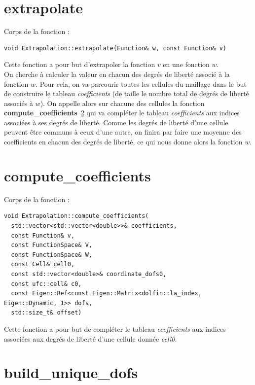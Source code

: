 \documentclass[french]{article}
\begin{document}
	\section{extrapolate}
	\label{extrapolate}
	
	Corps de la fonction :

	\begin{lstlisting}
void Extrapolation::extrapolate(Function& w, const Function& v)
	\end{lstlisting}
	
	Cette fonction a pour but d'extrapoler la fonction $v$ en une fonction $w$. \\
	
	On cherche à calculer la valeur en chacun des degrés de liberté associé à la fonction $w$. Pour cela, on va parcourir toutes les cellules du maillage dans le but de construire le tableau \textit{coefficients} (de taille le nombre total de degrés de liberté associés à $w$). On appelle alors sur chacune des cellules la fonction \textbf{compute\_coefficients}~\ref{compute_coefficients} qui va compléter le tableau \textit{coefficients} aux indices associées à ses degrés de liberté. Comme les degrés de liberté d'une cellule peuvent être communs à ceux d'une autre, on finira par faire une moyenne des coefficients en chacun des degrés de liberté, ce qui nous donne alors la fonction $w$. 
	
	\section{compute\_coefficients}
	\label{compute_coefficients}
	
	Corps de la fonction :
	
	\begin{lstlisting}
void Extrapolation::compute_coefficients(
  std::vector<std::vector<double>>& coefficients,
  const Function& v,
  const FunctionSpace& V,
  const FunctionSpace& W,
  const Cell& cell0,
  const std::vector<double>& coordinate_dofs0,
  const ufc::cell& c0,
  const Eigen::Ref<const Eigen::Matrix<dolfin::la_index, Eigen::Dynamic, 1>> dofs,
  std::size_t& offset)
	\end{lstlisting}
	
	Cette fonction a pour but de compléter le tableau \textit{coefficients} aux indices associées aux degrés de liberté d'une cellule donnée \textit{cell0}. 
	
	
	
	\section{build\_unique\_dofs}
	\label{build_unique_dofs}
	
\end{document}
